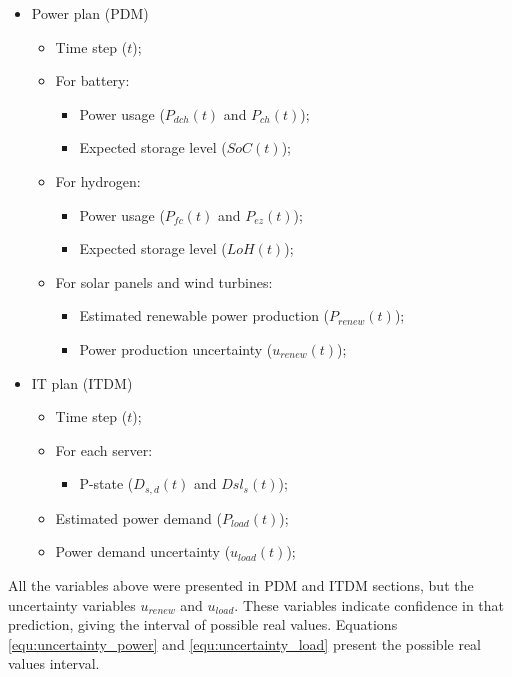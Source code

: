 \begin{itemize}
    \item Power plan (PDM)
    \begin{itemize}
        \item Time step ($t$);
        \item For battery:
        \begin{itemize}
            \item Power usage ($P_{dch}(t)$ and $P_{ch}(t)$);
            \item Expected storage level ($SoC(t)$);
        \end{itemize}
        \item For hydrogen:
        \begin{itemize}
            \item Power usage ($P_{fc}(t)$ and $P_{ez}(t)$);
            \item Expected storage level ($LoH(t)$);
        \end{itemize}
        \item For solar panels and wind turbines:
        \begin{itemize}
            \item Estimated renewable power production ($P_{renew}(t)$);
            \item Power production uncertainty ($u_{renew}(t)$);
        \end{itemize}
    \end{itemize}
    \item IT plan (ITDM)
    \begin{itemize}
        \item Time step ($t$);
        \item For each server:
        \begin{itemize}
            \item P-state ($D_{s,d}(t)$ and $Dsl_{s}(t)$);
        \end{itemize}
        \item Estimated power demand ($P_{load}(t)$);
        \item Power demand uncertainty ($u_{load}(t)$);
    \end{itemize}
\end{itemize}

All the variables above were presented in PDM and ITDM sections, but the uncertainty variables $u_{renew}$ and $u_{load}$. These variables indicate confidence in that prediction, giving the interval of possible real values. Equations \ref{equ:uncertainty_power} and \ref{equ:uncertainty_load} present the possible real values interval.

